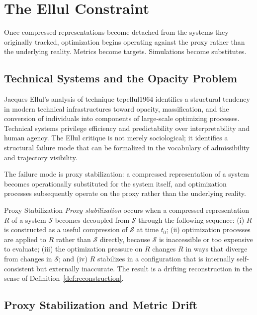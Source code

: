\chapter{The Ellul Constraint}
\label{ch:ellul}

\epigraph{Once compressed representations become detached from the systems they
originally tracked, optimization begins operating against the proxy rather than
the underlying reality. Metrics become targets. Simulations become substitutes.}{}

\section{Technical Systems and the Opacity Problem}

Jacques Ellul's analysis of technique 	tep{ellul1964} identifies a structural tendency in modern
technical infrastructures toward opacity, massification, and the conversion of
individuals into components of large-scale optimizing processes. Technical systems
privilege efficiency and predictability over interpretability and human agency.
The Ellul critique is not merely sociological; it identifies a structural failure
mode that can be formalized in the vocabulary of admissibility and trajectory
visibility.

The failure mode is proxy stabilization: a compressed representation of a system
becomes operationally substituted for the system itself, and optimization processes
subsequently operate on the proxy rather than the underlying reality.

\begin{definition}{Proxy Stabilization}
\emph{Proxy stabilization} occurs when a compressed representation $R$ of a system
$\mathcal{S}$ becomes decoupled from $\mathcal{S}$ through the following sequence:
(i) $R$ is constructed as a useful compression of $\mathcal{S}$ at time $t_0$;
(ii) optimization processes are applied to $R$ rather than $\mathcal{S}$ directly,
because $\mathcal{S}$ is inaccessible or too expensive to evaluate;
(iii) the optimization pressure on $R$ changes $R$ in ways that diverge from changes
in $\mathcal{S}$; and (iv) $R$ stabilizes in a configuration that is internally
self-consistent but externally inaccurate. The result is a drifting reconstruction
in the sense of Definition~\ref{def:reconstruction}.
\end{definition}

\section{Proxy Stabilization and Metric Drift}

